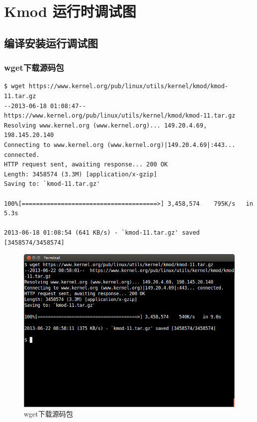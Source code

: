\documentclass[11pt,a4paper]{article}
\makeatletter
\def\maxwidth{\ifdim\Gin@nat@width>\linewidth\linewidth
\else\Gin@nat@width\fi}
\let\Oldincludegraphics\includegraphics
\renewcommand{\includegraphics}[1]{\Oldincludegraphics[width=\maxwidth]{#1}}
\makeatother
\begin{document}
\section{Kmod 运行时调试图}

\subsection{编译安装运行调试图}

\subsubsection{wget下载源码包}

{\begin{shaded}\begin{verbatim}
$ wget https://www.kernel.org/pub/linux/utils/kernel/kmod/kmod-11.tar.gz
--2013-06-18 01:08:47--  https://www.kernel.org/pub/linux/utils/kernel/kmod/kmod-11.tar.gz
Resolving www.kernel.org (www.kernel.org)... 149.20.4.69, 198.145.20.140
Connecting to www.kernel.org (www.kernel.org)|149.20.4.69|:443... connected.
HTTP request sent, awaiting response... 200 OK
Length: 3458574 (3.3M) [application/x-gzip]
Saving to: `kmod-11.tar.gz'

100%[======================================>] 3,458,574    795K/s   in 5.3s    

2013-06-18 01:08:54 (641 KB/s) - `kmod-11.tar.gz' saved [3458574/3458574]
\end{verbatim}\end{shaded}}
\begin{figure}[htbp]
\centering
\includegraphics{./pictures/1-1-wget.png}
\caption{wget下载源码包}
\end{figure}
\end{document}
